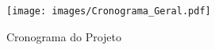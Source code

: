 \begin{figure}
\centering
\texttt{[image: images/Cronograma\_Geral.pdf]}
\caption{Cronograma do Projeto}
\end{figure}
